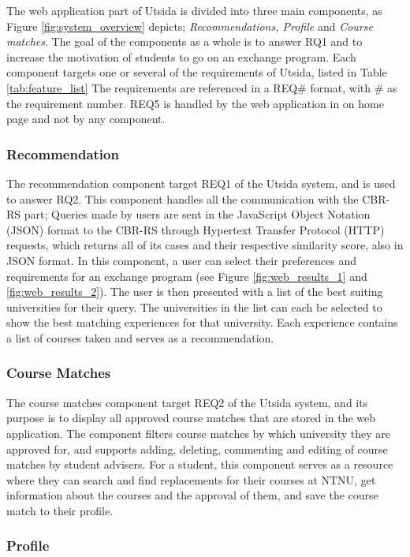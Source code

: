 The web application part of Utsida is divided into three main components, as Figure \ref{fig:system_overview} depicts; \emph{Recommendations, Profile} and \emph{Course matches}. The goal of the components as a whole is to answer RQ1 and to increase the motivation of students to go on an exchange program. Each component targets one or several of the requirements of Utsida, listed in Table \ref{tab:feature_list} The requirements are referenced in a REQ\# format, with \# as the requirement number. REQ5 is handled by the web application in on home page and not by any component.

\subsubsection{Recommendation}

The recommendation component target REQ1 of the Utsida system, and is used to answer RQ2. This component handles all the communication with the CBR-RS part; Queries made by users are sent in the JavaScript Object Notation (JSON) format to the CBR-RS through Hypertext Transfer Protocol (HTTP) requests, which returns all of its cases and their respective similarity score, also in JSON format. In this component, a user can select their preferences and requirements for an exchange program (see Figure \ref{fig:web_results_1} and \ref{fig:web_results_2}). The user is then presented with a list of the best suiting universities for their query. The universities in the list can each be selected to show the best matching experiences for that university. Each experience contains a list of courses taken and serves as a recommendation.

\subsubsection{Course Matches}\label{sec_course_matches}

The course matches component target REQ2 of the Utsida system, and its purpose is to display all approved course matches that are stored in the web application. The component filters course matches by which university they are approved for, and supports adding, deleting, commenting and editing of course matches by student advisers. For a student, this component serves as a resource where they can search and find replacements for their courses at NTNU, get information about the courses and the approval of them, and save the course match to their profile.

\subsubsection{Profile}

